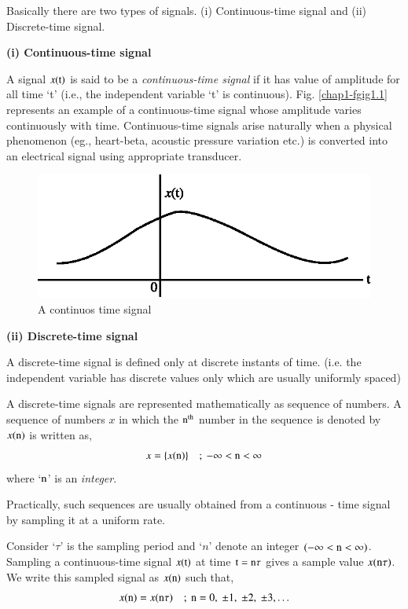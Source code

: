 Basically there are two types of signals. (i) Continuous-time signal and (ii) Discrete-time signal.

\medskip
\noindent
{\bf (i) Continuous-time signal}
\smallskip

A signal $x(\textrm{t})$ is said to be a {\em continuous-time signal} if it has value of amplitude for all time `t' (i.e., the independent variable `t' is continuous). Fig. \ref{chap1-fgig1.1} represents an example of a continuous-time signal whose amplitude varies continuously with time. Continuous-time signals arise naturally when a physical phenomenon (eg., heart-beta, acoustic pressure variation etc.) is converted into an electrical signal using appropriate transducer.
\begin{figure}[H]
\centering
\includegraphics{src/chap1/fig1.eps}
\caption{A continuos time signal}\label{chap1-fig1.1}
\end{figure}

\medskip
\noindent
{\bf (ii) Discrete-time signal}
\smallskip

A discrete-time signal is defined only at discrete instants of time. (i.e. the independent variable has discrete values only which are usually uniformly spaced)

A discrete-time signals are represented mathematically as sequence of numbers. A sequence of numbers $x$ in which the $\textrm{n}^{\text{th}}$ number in the sequence is denoted by $x(\textrm{n})$ is written as,
$$
x=\{x(\textrm{n})\}\quad ;~ -\infty<\textrm{n}<\infty
$$
where `$\textrm{n}$' is an {\em integer}.

Practically, such sequences are usually obtained from a continuous - time signal by sampling it at a uniform rate.

Consider `$\tau$' is the sampling period and `$n$' denote an integer $(-\infty<\textrm{n}<\infty)$. Sampling a continuous-time signal $x(\textrm{t})$ at time $\textrm{t}=\textrm{n}\tau$ gives a sample value $x(\textrm{n}\tau)$. We write this sampled signal as $x(\textrm{n})$ such that,
$$
x(\textrm{n})=x(\textrm{n}\tau)\quad ;~ \textrm{n}=0, \ \pm 1, \ \pm 2, \ \pm 3,\ldots
$$

